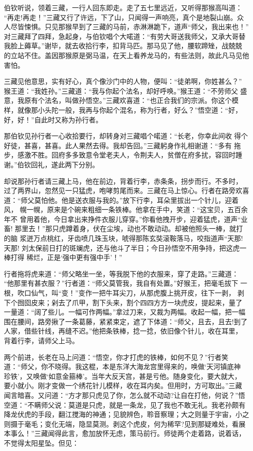 伯钦听说，领着三藏，一行人回东即走。走了五七里远近，又听得那猴高叫道：
“再走!再走！”三藏又行了许远，下了山，只闻得一声响亮，真个是地裂山崩。众
人尽皆悚惧。只见那猴早到了三藏的马前，赤淋淋跪下，道声“师父，我出来也！”
对三藏拜了四拜，急起身，与伯钦唱个大喏道：“有劳大哥送我师父，又承大哥替
我脸上薅草。”谢毕，就去收拾行李，扣背马匹。那马见了他，腰软蹄矬，战兢兢
的立站不住。盖因那猴原是弼马温，在天上看养龙马的，有些法则，故此凡马见他
害怕。

三藏见他意思，实有好心，真个像沙门中的人物，便叫：“徒弟啊，你姓甚么？”
猴王道：“我姓孙。”三藏道：“我与你起个法名，却好呼唤。”猴王道：“不劳师父
盛意，我原有个法名，叫做孙悟空。”三藏欢喜道：“也正合我们的宗派。你这个模
样，就像那小头陀一般，我再与你起个混名，称为行者，好么？”悟空道：“好，
好，好！”自此时又称为孙行者。

那伯钦见孙行者一心收拾要行，却转身对三藏唱个喏道：“长老，你幸此间收
得个好徒，甚喜，甚喜。此人果然去得。我却告回。”三藏躬身作礼相谢道：“多有
拖步，感激不胜。回府多多致意令堂老夫人，令荆夫人，贫僧在府多扰，容回时踵
谢。”伯钦回礼，遂此两下分别。

却说那孙行者请三藏上马，他在前边，背着行李，赤条条，拐步而行。不多时，
过了两界山，忽然见一只猛虎，咆哮剪尾而来。三藏在马上惊心。行者在路旁欢喜
道：“师父莫怕他。他是送衣服与我的。”放下行李，耳朵里拔出一个针儿，迎着风，
幌一幌，原来是个碗来粗细一条铁棒。他拿在手中，笑道：“这宝贝，五百余年不
曾用着他，今日拿出来挣件衣服儿穿穿。”你看他拽开步，迎着猛虎，道声“业畜!
那里去！”那只虎蹲着身，伏在尘埃，动也不敢动动。却被他照头一棒，就打的脑
浆迸万点桃红，牙齿喷几珠玉块，唬得那陈玄奘滚鞍落马，咬指道声“天那!天那!
刘太保前日打的斑斓虎，还与他斗了半日；今日孙悟空不用争持，把这虎一棒打得
稀烂，正是‘强中更有强中手’！”

行者拖将虎来道：“师父略坐一坐，等我脱下他的衣服来，穿了走路。”三藏道：
“他那里有甚衣服？”行者道：“师父莫管我，我自有处置。”好猴王，把毫毛拔下
一根，吹口仙气，叫“变！”变作一把牛耳尖刀，从那虎腹上挑开皮，往下一剥，
剥下个囫囵皮来；剁去了爪甲，割下头来，割个四四方方一块虎皮，提起来，量了
一量道：“阔了些儿。一幅可作两幅。”拿过刀来，又裁为两幅。收起一幅，把一幅
围在腰间，路旁揪了一条葛藤，紧紧束定，遮了下体道：“师父，且去，且去!到了
人家，借些针线，再缝不迟。”他把条铁棒，捻一捻，依旧像个针儿，收在耳里，
背着行李，请师父上马。

两个前进，长老在马上问道：“悟空，你才打虎的铁棒，如何不见？”行者笑
道：“师父，你不晓得。我这棍，本是东洋大海龙宫里得来的，唤做‘天河镇底神
珍铁’，又唤做‘如意金箍棒’。当年大反天宫，甚是亏他。随身变化，要大就大，
要小就小。刚才变做一个绣花针儿模样，收在耳内矣。但用时，方可取出。”三藏
闻言暗喜。又问道：“方才那只虎见了你，怎么就不动动?让自在打他，何说？”悟
空道：“不瞒师父说：莫道是只虎，就是一条龙，见了我也不敢无礼。我老孙颇有
降龙伏虎的手段，翻江搅海的神通；见貌辨色，聆音察理；大之则量于宇宙，小之
则摄于毫毛；变化无端，隐显莫测。剥这个虎皮，何为稀罕?见到那疑难处，看展
本事么！”三藏闻得此言，愈加放怀无虑，策马前行。师徒两个走着路，说着话，
不觉得太阳星坠。但见：

